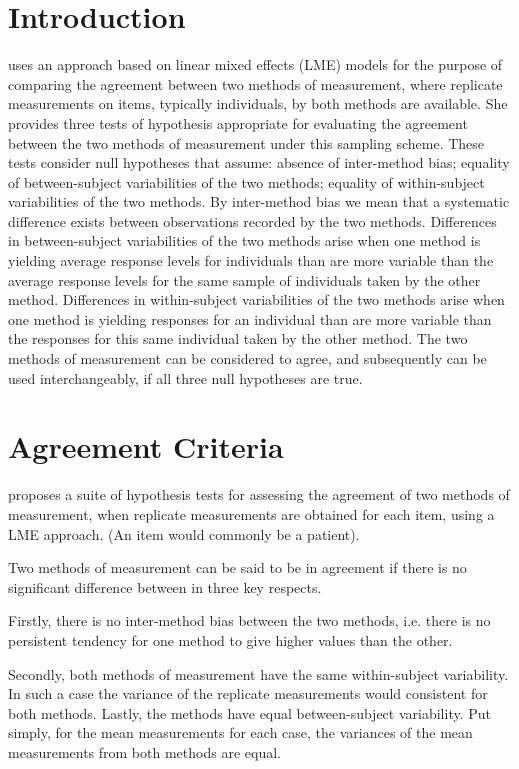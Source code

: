 \documentclass[12pt, a4paper]{report}
\theoremstyle{plain}
\theoremstyle{definition}
\theoremstyle{remark}
\begin{document}
\section{Introduction}

\citet{roy} uses an approach based on linear mixed effects (LME) models for the purpose of comparing the agreement between two methods of measurement, where replicate measurements on items, typically individuals, by both methods are available. She provides three tests of hypothesis appropriate for evaluating the agreement between the two methods of measurement under this sampling scheme. These tests consider null hypotheses that assume: absence of inter-method bias; equality of between-subject variabilities of the two methods; equality of within-subject variabilities of the two methods. By inter-method bias we mean that a systematic difference exists between observations recorded by the two methods. Differences in between-subject variabilities of the two methods arise when one method is yielding average response levels for individuals than are more variable than the average response levels for the same sample of individuals taken by the other method.  Differences in within-subject variabilities of the two methods arise when one method is yielding responses for an individual than are more variable than the responses for this same individual taken by the other method. The two methods of measurement can be considered to agree, and subsequently can be used interchangeably, if all three null hypotheses are true.


\bigskip


	\section{Agreement Criteria}

		
	\citet{ARoy2009} proposes a suite of hypothesis tests for assessing the agreement of two methods of measurement, when replicate measurements are obtained for each item, using a LME approach. (An item would commonly be a patient).  
	
	Two methods of measurement can be said to be in agreement if there is no significant difference between in three key respects. 
	
	Firstly, there is no inter-method bias between the two methods, i.e. there is no persistent tendency for one method to give higher values than the other.
	
	Secondly, both methods of measurement have the same  within-subject variability. In such a case the variance of the replicate measurements would consistent for both methods.
	Lastly, the methods have equal between-subject variability.  Put simply, for the mean measurements for each case, the variances of the mean measurements from both methods are equal.
	
\end{document}

